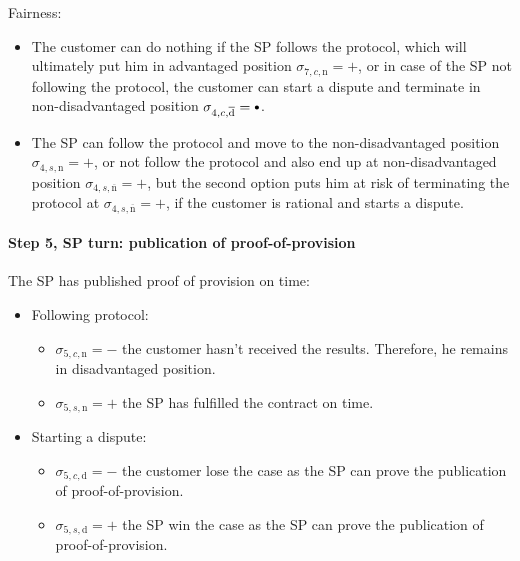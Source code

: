 \documentclass{ieeeaccess}
\newcommand\sbullet[1][.75]{\mathbin{\ThisStyle{\vcenter{\hbox{%
  \scalebox{#1}{$\SavedStyle\bullet$}}}}}%
}
\begin{document}
Fairness:

\begin{itemize}

\item
  The customer can do nothing if the SP follows the protocol, which will
  ultimately put him in advantaged position
  \(\sigma_{7, c, \mathrm{n}} = +\), or in case of the SP not following
  the protocol, the customer can start a dispute and terminate in
  non-disadvantaged position
  \(\sigma_{4, c, \overline{\mathrm{d}}} = \sbullet\).
\item
  The SP can follow the protocol and move to the non-disadvantaged
  position \(\sigma_{4, s, \mathrm{n}} = +\), or not follow the protocol
  and also end up at non-disadvantaged position
  \(\sigma_{4, s, \overline{\mathrm{n}}} = +\), but the second option
  puts him at risk of terminating the protocol at
  \(\sigma_{4, s, \overline{\mathrm{n}}} = +\), if the customer is
  rational and starts a dispute.
\end{itemize}

\paragraph{Step 5, SP turn: publication of proof-of-provision}\label{step-5-publication-of-proof-of-provision}

The SP has published proof of provision on time:

\begin{itemize}
\item
  Following protocol:

  \begin{itemize}
  
  \item
    \(\sigma_{5, c, \mathrm{n}} = -\) the customer hasn't received the
    results. Therefore, he remains in disadvantaged position.
  \item
    \(\sigma_{5, s, \mathrm{n}} = +\) the SP has fulfilled the contract
    on time.
  \end{itemize}
\item
  Starting a dispute:

  \begin{itemize}
  
  \item
    \(\sigma_{5, c, \mathrm{d}} = -\) the customer lose the case as the
    SP can prove the publication of proof-of-provision.
  \item
    \(\sigma_{5, s, \mathrm{d}} = +\) the SP win the case as the SP can
    prove the publication of proof-of-provision.
  \end{itemize}
\end{itemize}
\end{document}
